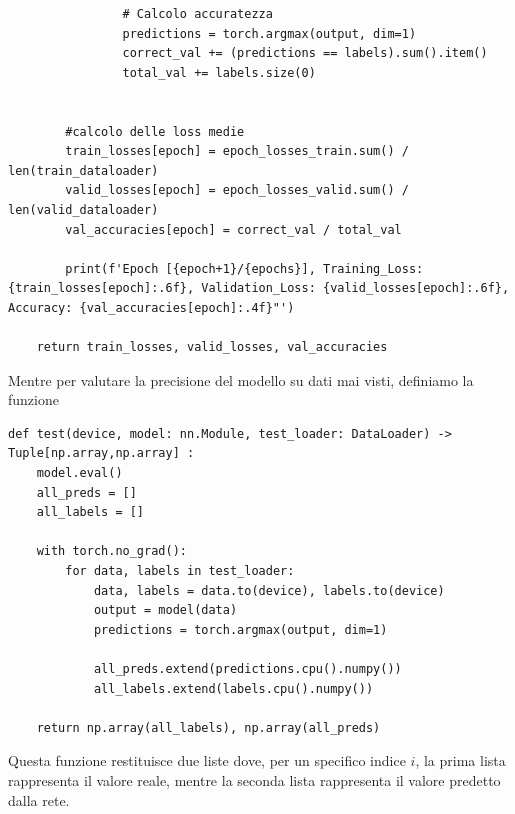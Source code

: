 \begin{lstlisting}
                # Calcolo accuratezza
                predictions = torch.argmax(output, dim=1)
                correct_val += (predictions == labels).sum().item()
                total_val += labels.size(0)
        
        
        #calcolo delle loss medie
        train_losses[epoch] = epoch_losses_train.sum() / len(train_dataloader)
        valid_losses[epoch] = epoch_losses_valid.sum() / len(valid_dataloader)
        val_accuracies[epoch] = correct_val / total_val
        
        print(f'Epoch [{epoch+1}/{epochs}], Training_Loss: {train_losses[epoch]:.6f}, Validation_Loss: {valid_losses[epoch]:.6f}, Accuracy: {val_accuracies[epoch]:.4f}"')
    
    return train_losses, valid_losses, val_accuracies
\end{lstlisting}

Mentre per valutare la precisione del modello su dati mai visti, definiamo la
funzione

\begin{lstlisting}
def test(device, model: nn.Module, test_loader: DataLoader) -> Tuple[np.array,np.array] :
    model.eval()
    all_preds = []
    all_labels = []

    with torch.no_grad():
        for data, labels in test_loader:
            data, labels = data.to(device), labels.to(device)
            output = model(data)
            predictions = torch.argmax(output, dim=1)

            all_preds.extend(predictions.cpu().numpy())
            all_labels.extend(labels.cpu().numpy())

    return np.array(all_labels), np.array(all_preds)
\end{lstlisting}

Questa funzione restituisce due liste dove, per un specifico indice $i$, la prima 
lista rappresenta il valore reale, mentre la seconda lista rappresenta il valore 
predetto dalla rete. 

